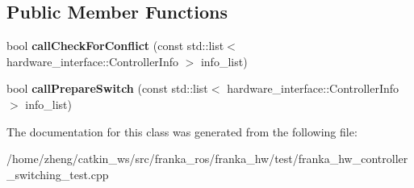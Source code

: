 \subsection*{Public Member Functions}
\begin{DoxyCompactItemize}
\item 
\mbox{\label{classfranka__hw_1_1_no_controller_conflict_adc0beb7d462d48a19da3a966120caf0d}} 
bool {\bfseries call\+Check\+For\+Conflict} (const std\+::list$<$ hardware\+\_\+interface\+::\+Controller\+Info $>$ info\+\_\+list)
\item 
\mbox{\label{classfranka__hw_1_1_no_controller_conflict_a4519c3e2f31630b18894aaf2409a61e3}} 
bool {\bfseries call\+Prepare\+Switch} (const std\+::list$<$ hardware\+\_\+interface\+::\+Controller\+Info $>$ info\+\_\+list)
\end{DoxyCompactItemize}


The documentation for this class was generated from the following file\+:\begin{DoxyCompactItemize}
\item 
/home/zheng/catkin\+\_\+ws/src/franka\+\_\+ros/franka\+\_\+hw/test/franka\+\_\+hw\+\_\+controller\+\_\+switching\+\_\+test.\+cpp\end{DoxyCompactItemize}
